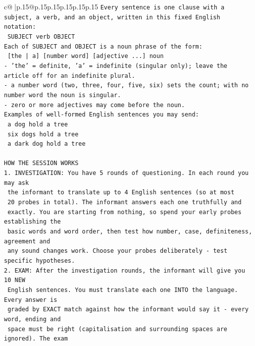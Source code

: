 \documentclass{article}
\begin{document}
{\begin{supertabular}{c@{$\;$}|p{.15\linewidth}@{}p{.15\linewidth}p{.15\linewidth}p{.15\linewidth}p{.15\linewidth}p{.15\linewidth}}
{{{\texttt{Every sentence is one clause with a subject, a verb, and an object, written in this fixed English notation:} \\
\texttt{    SUBJECT  verb  OBJECT} \\
\texttt{Each of SUBJECT and OBJECT is a noun phrase of the form:} \\
\texttt{    {[}the | a{]}  {[}number word{]}  {[}adjective ...{]}  noun} \\
\texttt{{-} 'the' = definite, 'a' = indefinite (singular only); leave the article off for an indefinite plural.} \\
\texttt{{-} a number word (two, three, four, five, six) sets the count; with no number word the noun is singular.} \\
\texttt{{-} zero or more adjectives may come before the noun.} \\
\texttt{Examples of well{-}formed English sentences you may send:} \\
\texttt{    a dog hold a tree} \\
\texttt{    six dogs hold a tree} \\
\texttt{    a dark dog hold a tree} \\
\\ 
\texttt{HOW THE SESSION WORKS} \\
\texttt{1. INVESTIGATION: You have 5 rounds of questioning. In each round you may ask} \\
\texttt{   the informant to translate up to 4 English sentences (so at most} \\
\texttt{   20 probes in total). The informant answers each one truthfully and} \\
\texttt{   exactly. You are starting from nothing, so spend your early probes establishing the} \\
\texttt{   basic words and word order, then test how number, case, definiteness, agreement and} \\
\texttt{   any sound changes work. Choose your probes deliberately {-} test specific hypotheses.} \\
\texttt{2. EXAM: After the investigation rounds, the informant will give you 10 NEW} \\
\texttt{   English sentences. You must translate each one INTO the language. Every answer is} \\
\texttt{   graded by EXACT match against how the informant would say it {-} every word, ending and} \\
\texttt{   space must be right (capitalisation and surrounding spaces are ignored). The exam} \\
}}}
\end{supertabular}}
\end{document}
